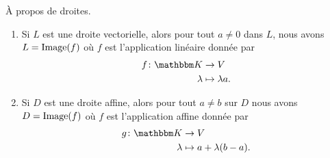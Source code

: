 \begin{lemma}
    À propos de droites.
    \begin{enumerate}
        \item       \label{ITEMooYQCIooOrhRwj}
            Si \( L\) est une droite vectorielle, alors pour tout \( a\neq 0\) dans \( L\), nous avons \( L=\operatorname{Image}(f)\) où \( f\) est l'application linéaire donnée par
            \begin{equation}
                \begin{aligned}
                    f\colon \eK&\to V \\
                    \lambda&\mapsto \lambda a. 
                \end{aligned}
            \end{equation}
        \item       \label{ITEMooZIGMooGruFMP}
            Si \( D\) est une droite affine, alors pour tout \( a\neq b\) sur \( D\) nous avons \( D=\operatorname{Image}(f)\) où \( f\) est l'application affine donnée par
            \begin{equation}
                \begin{aligned}
                    g\colon \eK&\to V \\
                    \lambda&\mapsto a+\lambda(b-a). 
                \end{aligned}
            \end{equation}
    \end{enumerate}
\end{lemma}


